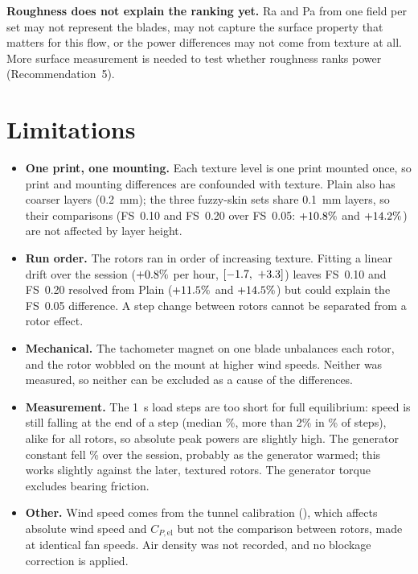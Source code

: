 \documentclass[11pt]{article}
\begin{document}
\textbf{Roughness does not explain the ranking yet.} Ra and Pa from one field per set may not
represent the blades, may not capture the surface property that matters for this flow, or the power
differences may not come from texture at all. More surface measurement is needed to test whether
roughness ranks power (Recommendation~5).

\FloatBarrier
\section{Limitations}\label{sec:limits}
\begin{itemize}
  \item \textbf{One print, one mounting.} Each texture level is one print mounted once, so print and
        mounting differences are confounded with texture. Plain also has coarser layers
        (\SI{0.2}{mm}); the three fuzzy-skin sets share \SI{0.1}{mm} layers, so their comparisons
        (FS~0.10 and FS~0.20 over FS~0.05: $+10.8\%$ and $+14.2\%$) are not affected by layer height.
  \item \textbf{Run order.} The rotors ran in order of increasing texture. Fitting a linear drift
        over the session ($+0.8\%$ per hour, $[-1.7,\ +3.3]$) leaves FS~0.10 and
        FS~0.20 resolved from Plain ($+11.5\%$ and $+14.5\%$) but could explain the FS~0.05
        difference. A step change between rotors cannot be separated from a rotor effect.
  \item \textbf{Mechanical.} The tachometer magnet on one blade unbalances each rotor, and the rotor
        wobbled on the mount at higher wind speeds. Neither was measured, so neither can be
        excluded as a cause of the differences.
  \item \textbf{Measurement.} The \SI{1}{s} load steps are too short for full equilibrium: speed is
        still falling at the end of a step (median \tkSettleMed\%, more than 2\% in \tkSettleTwo\% of
        steps), alike for all rotors, so absolute peak powers are slightly high. The generator
        constant fell \tkKDriftPct\% over the session, probably as the generator warmed; this works
        slightly against the later, textured rotors. The generator torque excludes bearing friction.
  \item \textbf{Other.} Wind speed comes from the tunnel
        calibration (), which affects absolute wind speed and $C_{P,\mathrm{el}}$
        but not the comparison between rotors, made at identical fan speeds. Air density was not
        recorded, and no blockage correction is applied.
\end{itemize}
\end{document}
